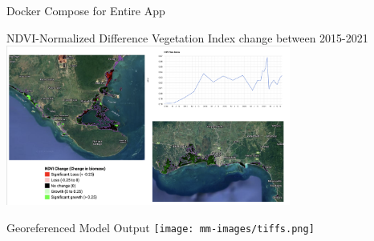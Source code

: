 




\begin{frame}{Docker Compose for Entire App}
\end{frame}

\begin{frame}{NDVI-Normalized Difference Vegetation Index change between 2015-2021}
    \centering
    \includegraphics[height=0.7\textheight,width=0.7\textwidth,keepaspectratio]{mm-images/ndvi.png}
\end{frame}

\begin{frame}{Georeferenced Model Output}
    \centering
    \texttt{[image: mm-images/tiffs.png]}
\end{frame}
